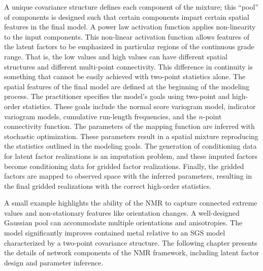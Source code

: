 A unique covariance structure defines each component of the mixture; this ``pool'' of components is designed such that certain components impart certain spatial features in the final model. A power law activation function applies non-linearity to the input components. This non-linear activation function allows features of the latent factors to be emphasized in particular regions of the continuous grade range. That is, the low values and high values can have different spatial structures and different multi-point connectivity. This difference in continuity is something that cannot be easily achieved with two-point statistics alone. The spatial features of the final model are defined at the beginning of the modeling process. The practitioner specifies the model's goals using two-point and high-order statistics. These goals include the normal score variogram model, indicator variogram models, cumulative run-length frequencies, and the $n$-point connectivity function. The parameters of the mapping function are inferred with stochastic optimization. These parameters result in a spatial mixture reproducing the statistics outlined in the modeling goals. The generation of conditioning data for latent factor realizations is an imputation problem, and these imputed factors become conditioning data for gridded factor realizations. Finally, the gridded factors are mapped to observed space with the inferred parameters, resulting in the final gridded realizations with the correct high-order statistics.

A small example highlights the ability of the \gls{NMR} to capture connected extreme values and non-stationary features like orientation changes. A well-designed Gaussian pool can accommodate multiple orientations and anisotropies. The model significantly improves contained metal relative to an \gls{SGS} model characterized by a two-point covariance structure. The following chapter presents the details of network components of the \gls{NMR} framework, including latent factor design and parameter inference.